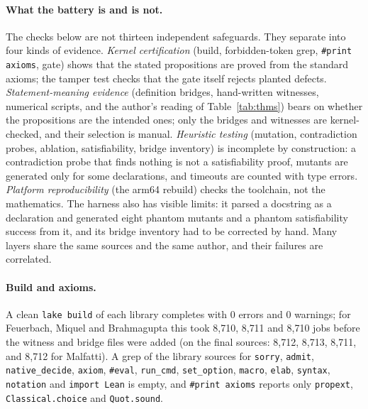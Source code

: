 \documentclass[11pt]{article}
\theoremstyle{definition}
\theoremstyle{remark}
\newcommand{\lean}[1]{\texttt{#1}}
\begin{document}
\paragraph{What the battery is and is not.} The checks below are not thirteen independent
safeguards. They separate into four kinds of evidence. \emph{Kernel certification} (build,
forbidden-token grep, \lean{\#print axioms}, gate) shows that the stated propositions are proved
from the standard axioms; the tamper test checks that the gate itself rejects planted defects.
\emph{Statement-meaning evidence} (definition bridges, hand-written witnesses, numerical scripts,
and the author's reading of Table~\ref{tab:thms}) bears on whether the propositions are the
intended ones; only the bridges and witnesses are kernel-checked, and their selection is manual.
\emph{Heuristic testing} (mutation, contradiction probes, ablation, satisfiability, bridge
inventory) is incomplete by construction: a contradiction probe that finds nothing is not a
satisfiability proof, mutants are generated only for some declarations, and timeouts are counted
with type errors. \emph{Platform reproducibility} (the arm64 rebuild) checks the toolchain, not
the mathematics. The harness also has visible limits: it parsed a docstring as a declaration and
generated eight phantom mutants and a phantom satisfiability success from it, and its bridge
inventory had to be corrected by hand. Many layers share the same sources and the same author, and
their failures are correlated.

\paragraph{Build and axioms.} A clean \lean{lake build} of each library completes with 0 errors and
0 warnings; for Feuerbach, Miquel and Brahmagupta this took 8{,}710, 8{,}711 and 8{,}710 jobs
before the witness and bridge files were added (on the final sources: 8{,}712, 8{,}713, 8{,}711, and
8{,}712 for Malfatti). A
grep of the library sources for \lean{sorry}, \lean{admit}, \lean{native\_decide}, \lean{axiom},
\lean{\#eval}, \lean{run\_cmd}, \lean{set\_option}, \lean{macro}, \lean{elab}, \lean{syntax},
\lean{notation} and \lean{import Lean} is empty, and \lean{\#print axioms} reports only
\lean{propext}, \lean{Classical.choice} and \lean{Quot.sound}.
\end{document}
